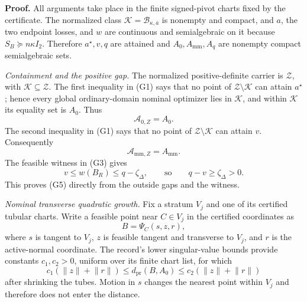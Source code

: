 \textbf{Proof.}
All arguments take place in the finite signed-pivot charts fixed by the certificate.  The normalized class \(\mathcal K=\mathcal B_{\kappa,\overline a}\) is nonempty and compact, and \(a\), the two endpoint losses, and \(w\) are continuous and semialgebraic on it because \(S_B\succeq n\kappa I_2\).  Therefore \(a^\star,v,q\) are attained and \(A_0,A_{\mathrm{mm}},A_q\) are nonempty compact semialgebraic sets.

\emph{Containment and the positive gap.}
The normalized positive-definite carrier is \(\mathcal Z\), with \(\mathcal K\subseteq\mathcal Z\).  The first inequality in (G1) says that no point of \(\mathcal Z\setminus\mathcal K\) can attain \(a^\star\); hence every global ordinary-domain nominal optimizer lies in \(\mathcal K\), and within \(\mathcal K\) its equality set is \(A_0\).  Thus
\[
\mathcal A_{0,Z}=A_0.
\tag{1}
\]
The second inequality in (G1) says that no point of \(\mathcal Z\setminus\mathcal K\) can attain \(v\).  Consequently
\[
\mathcal A_{\mathrm{mm},Z}=A_{\mathrm{mm}}.
\tag{2}
\]
The feasible witness in (G3) gives
\[
v\le w(B_R)\le q-\zeta_\Delta,
\qquad\text{so}\qquad
q-v\ge\zeta_\Delta>0.
\tag{3}
\]
This proves (G5) directly from the outside gaps and the witness.

\emph{Nominal transverse quadratic growth.}
Fix a stratum \(V_j\) and one of its certified tubular charts.  Write a feasible point near \(C\in V_j\) in the certified coordinates as
\[
B=\Psi_C(s,z,r),
\tag{4}
\]
where \(s\) is tangent to \(V_j\), \(z\) is feasible tangent and transverse to \(V_j\), and \(r\) is the active-normal coordinate.  The record's lower singular-value bounds provide constants \(c_1,c_2>0\), uniform over its finite chart list, for which
\[
c_1(\lVert z\rVert+\lVert r\rVert)
\le d_{\mathrm{pr}}(B,A_0)
\le c_2(\lVert z\rVert+\lVert r\rVert)
\tag{5}
\]
after shrinking the tubes.  Motion in \(s\) changes the nearest point within \(V_j\) and therefore does not enter the distance.

